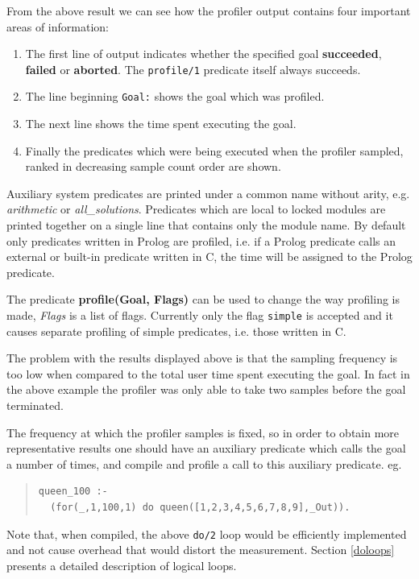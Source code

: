 From the above result we can see how the profiler output contains four
important areas of information:
\begin{enumerate}
\item The first line of output indicates whether the specified goal
\textbf{succeeded}, \textbf{failed} or \textbf{aborted}.  The
\verb+profile/1+ predicate itself always succeeds.
\item The line beginning \verb+Goal:+ shows the goal which was
profiled.
\item The next line shows the time spent executing the goal.
\item Finally the predicates which were being executed when the
profiler sampled, ranked in decreasing sample count order are shown. 
\end{enumerate}

Auxiliary system predicates are printed under a
common name without arity, e.g. {\it arithmetic} or {\it 
all_solutions}.
Predicates which are local to locked modules are printed
together on a single line that contains only the module name.
By default only predicates written in Prolog are profiled, i.e.
if a Prolog predicate calls an external or built-in predicate
written in C, the time will be assigned to the Prolog predicate.

The predicate {\bf profile(Goal, Flags)} can be used to change
the way profiling is made, {\it Flags} is a list of flags.
Currently only the flag {\tt simple} is accepted and it
causes separate profiling of simple predicates, i.e.
those written in C.

The problem with the results displayed above is that the sampling
frequency is too low when compared to the total user time spent
executing the goal.  In fact in the above example the profiler was
only able to take two samples before the goal terminated.

The frequency at which the profiler samples is fixed, so in order to
obtain more representative results one should have an auxiliary
predicate which calls the goal a number of times, and compile and
profile a call to this auxiliary predicate. eg.

\begin{quote}
\begin{verbatim}
queen_100 :-
  (for(_,1,100,1) do queen([1,2,3,4,5,6,7,8,9],_Out)).
\end{verbatim}
\end{quote}

Note that, when compiled, the above \verb+do/2+ loop would be
efficiently implemented and not cause overhead that would distort the
measurement.  Section \ref{doloops} presents a 
detailed description of logical loops.

